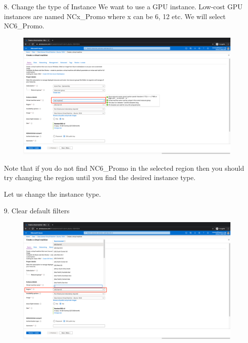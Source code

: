 8. Change the type of Instance
We want to use a GPU instance. Low-cost GPU instances are named NCx\_Promo where x can be 6, 12 etc. We will select NC6\_Promo. 

\begin{figure}[H]
\begin{center} 
\includegraphics[scale=0.20]{figures/vm6}
\end{center}
\end{figure}

Note that if you do not find NC6\_Promo in the selected region then you should try changing the region until you find the desired instance type.

Let us change the instance type.

9. Clear default filters

\begin{figure}[H]
\begin{center} 
\includegraphics[scale=0.20]{figures/vm7}
\end{center}
\end{figure}

